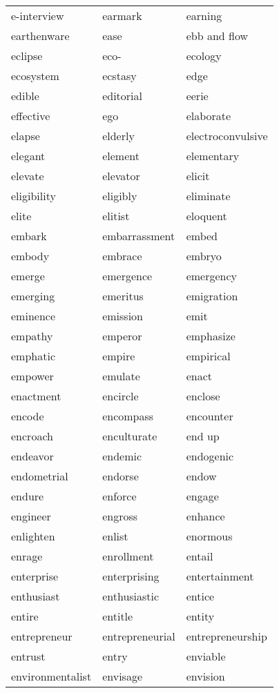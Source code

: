 \documentclass{minimal}
\begin{document}
\begin{longtable}{p{2.7cm}@{\hskip 0.2cm}p{2.7cm}@{\hskip 0.2cm}p{2.7cm}}
e-interview & earmark & earning \\
earthenware & ease & ebb and flow \\
eclipse & eco- & ecology \\
ecosystem & ecstasy & edge \\
edible & editorial & eerie \\
effective & ego & elaborate \\
elapse & elderly & electroconvulsive \\
elegant & element & elementary \\
elevate & elevator & elicit \\
eligibility & eligibly & eliminate \\
elite & elitist & eloquent \\
embark & embarrassment & embed \\
embody & embrace & embryo \\
emerge & emergence & emergency \\
emerging & emeritus & emigration \\
eminence & emission & emit \\
empathy & emperor & emphasize \\
emphatic & empire & empirical \\
empower & emulate & enact \\
enactment & encircle & enclose \\
encode & encompass & encounter \\
encroach & enculturate & end up \\
endeavor & endemic & endogenic \\
endometrial & endorse & endow \\
endure & enforce & engage \\
engineer & engross & enhance \\
enlighten & enlist & enormous \\
enrage & enrollment & entail \\
enterprise & enterprising & entertainment \\
enthusiast & enthusiastic & entice \\
entire & entitle & entity \\
entrepreneur & entrepreneurial & entrepreneurship \\
entrust & entry & enviable \\
environmentalist & envisage & envision \\

\end{longtable}
\end{document}
